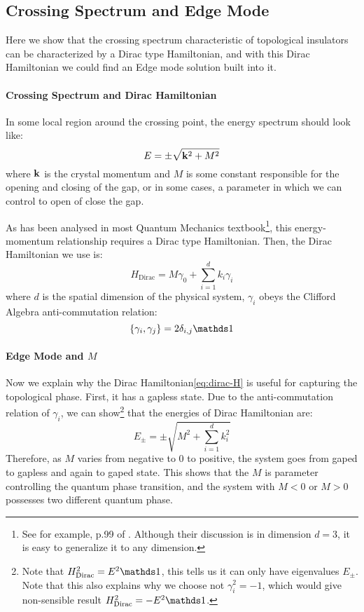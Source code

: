 \documentclass{article}
\begin{document}
\subsection{Crossing Spectrum and Edge Mode}
\label{sec:Crossing Spectrum and Edge Mode}
Here we show that the crossing spectrum characteristic of topological insulators
can be characterized by a Dirac type Hamiltonian, and with this Dirac
Hamiltonian we could find an Edge mode solution built into it.

\paragraph{Crossing Spectrum and Dirac Hamiltonian}
In some local region around the crossing point, the energy spectrum should look
like:
\begin{equation}
    E = \pm \sqrt{\vb{k}^2 + M^2}
\end{equation}
where $\vb{k}$ is the crystal momentum and $M$ is some constant
responsible for the opening and closing of the gap, or in some cases, a parameter
in which we can control to open of close the gap.

As has been analysed in most Quantum Mechanics textbook\footnote{See for
    example, p.99 of \cite{Greiner1997}. Although their discussion is in
dimension $d=3$, it is easy to generalize it to any dimension.}, this energy-momentum
relationship requires a Dirac type Hamiltonian. Then, the Dirac Hamiltonian we
use is:
\begin{equation}
    \label{eq:dirac-H}
    H_\text{Dirac} = M\gamma_0 + \sum_{i=1}^d k_i\gamma_i
\end{equation}
where $d$ is the spatial dimension of the physical system, $\gamma_i$ obeys the
Clifford Algebra anti-commutation relation:
\begin{equation}
    \{\gamma_i,\gamma_j\} = 2\delta_{i,j}\id
\end{equation}

\paragraph{Edge Mode and \texorpdfstring{$M$}{}}
Now we explain why the Dirac Hamiltonian\ref{eq:dirac-H}  is useful for capturing the topological
phase. First, it has a gapless state. Due to the anti-commutation relation of
$\gamma_i$, we can show\footnote{Note that $H_\text{Dirac}^2= E^2\id$, this
tells us it can only have eigenvalues $E_\pm$. Note that this also explains why
we choose not $\gamma_i^2=-1$, which would give non-sensible result
$H_\text{Dirac}^2= -E^2\id$.}
that the energies of Dirac Hamiltonian are:
\begin{equation}
    E_\pm = \pm\sqrt{M^2+\sum_{i=1}^d k^2_i}
\end{equation}
Therefore, as $M$ varies from negative to $0$ to positive, the system goes from
gaped to gapless and again to gaped state. This shows that the $M$ is parameter
controlling the quantum phase transition, and the system with $M<0$ or $M>0$
possesses two different quantum phase.
\end{document}
